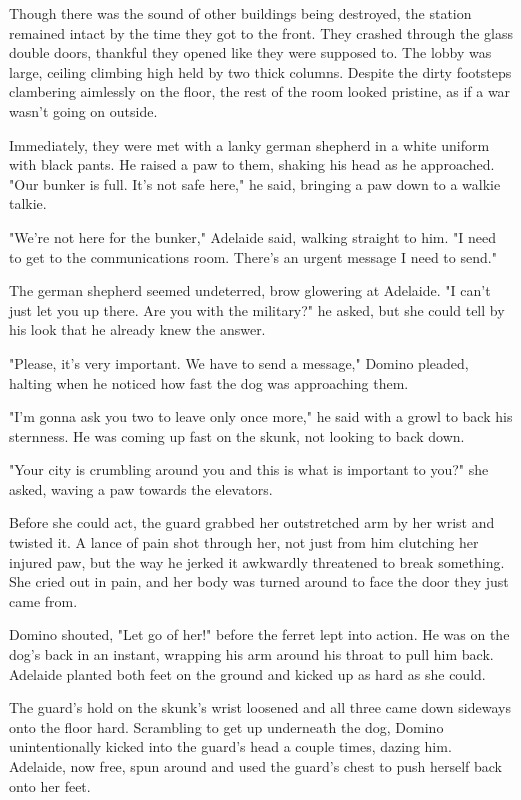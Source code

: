 Though there was the sound of other buildings being destroyed, the station remained intact by the time they got to the front. They crashed through the glass double doors, thankful they opened like they were supposed to. The lobby was large, ceiling climbing high held by two thick columns. Despite the dirty footsteps clambering aimlessly on the floor, the rest of the room looked pristine, as if a war wasn't going on outside.

Immediately, they were met with a lanky german shepherd in a white uniform with black pants. He raised a paw to them, shaking his head as he approached. "Our bunker is full. It's not safe here," he said, bringing a paw down to a walkie talkie.

"We're not here for the bunker," Adelaide said, walking straight to him. "I need to get to the communications room. There's an urgent message I need to send."

The german shepherd seemed undeterred, brow glowering at Adelaide. "I can't just let you up there. Are you with the military?" he asked, but she could tell by his look that he already knew the answer.

"Please, it's very important. We have to send a message," Domino pleaded, halting when he noticed how fast the dog was approaching them.

"I'm gonna ask you two to leave only once more," he said with a growl to back his sternness. He was coming up fast on the skunk, not looking to back down.

"Your city is crumbling around you and this is what is important to you?" she asked, waving a paw towards the elevators.

Before she could act, the guard grabbed her outstretched arm by her wrist and twisted it. A lance of pain shot through her, not just from him clutching her injured paw, but the way he jerked it awkwardly threatened to break something. She cried out in pain, and her body was turned around to face the door they just came from.

Domino shouted, "Let go of her!" before the ferret lept into action. He was on the dog's back in an instant, wrapping his arm around his throat to pull him back. Adelaide planted both feet on the ground and kicked up as hard as she could.

The guard's hold on the skunk's wrist loosened and all three came down sideways onto the floor hard. Scrambling to get up underneath the dog, Domino unintentionally kicked into the guard's head a couple times, dazing him. Adelaide, now free, spun around and used the guard's chest to push herself back onto her feet.

